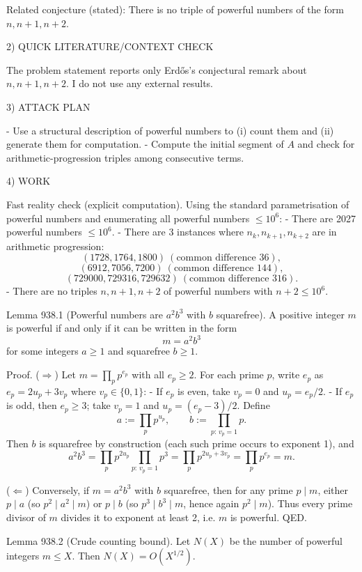 Related conjecture (stated): There is no triple of powerful numbers of the form \(n,n+1,n+2\).

2) QUICK LITERATURE/CONTEXT CHECK

The problem statement reports only Erd\H{o}s's conjectural remark about \(n,n+1,n+2\). I do not use any external results.

3) ATTACK PLAN

- Use a structural description of powerful numbers to (i) count them and (ii) generate them for computation.
- Compute the initial segment of \(A\) and check for arithmetic-progression triples among consecutive terms.

4) WORK

Fast reality check (explicit computation).
Using the standard parametrisation of powerful numbers and enumerating all powerful numbers \(\le 10^6\):
- There are 2027 powerful numbers \(\le 10^6\).
- There are 3 instances where \(n_k,n_{k+1},n_{k+2}\) are in arithmetic progression:
  \[(1728,1764,1800)\ (\text{common difference }36),\]
  \[(6912,7056,7200)\ (\text{common difference }144),\]
  \[(729000,729316,729632)\ (\text{common difference }316).\]
- There are no triples \(n,n+1,n+2\) of powerful numbers with \(n+2\le 10^6\).

Lemma 938.1 (Powerful numbers are \(a^2 b^3\) with \(b\) squarefree).
A positive integer \(m\) is powerful if and only if it can be written in the form
\[m=a^2 b^3\]
for some integers \(a\ge 1\) and squarefree \(b\ge 1\).

Proof.
(\(\Rightarrow\)) Let \(m=\prod_p p^{e_p}\) with all \(e_p\ge 2\). For each prime \(p\), write \(e_p\) as \(e_p=2u_p+3v_p\) where \(v_p\in\{0,1\}\):
- If \(e_p\) is even, take \(v_p=0\) and \(u_p=e_p/2\).
- If \(e_p\) is odd, then \(e_p\ge 3\); take \(v_p=1\) and \(u_p=(e_p-3)/2\).
Define
\[a:=\prod_p p^{u_p},\qquad b:=\prod_{p:\,v_p=1} p.
\]
Then \(b\) is squarefree by construction (each such prime occurs to exponent 1), and
\[a^2 b^3 = \prod_p p^{2u_p} \prod_{p:\,v_p=1} p^{3} = \prod_p p^{2u_p+3v_p} = \prod_p p^{e_p}=m.
\]

(\(\Leftarrow\)) Conversely, if \(m=a^2 b^3\) with \(b\) squarefree, then for any prime \(p\mid m\), either \(p\mid a\) (so \(p^2\mid a^2\mid m\)) or \(p\mid b\) (so \(p^3\mid b^3\mid m\), hence again \(p^2\mid m\)). Thus every prime divisor of \(m\) divides it to exponent at least 2, i.e. \(m\) is powerful.
QED.

Lemma 938.2 (Crude counting bound).
Let \(N(X)\) be the number of powerful integers \(m\le X\). Then \(N(X)=O(X^{1/2})\).

